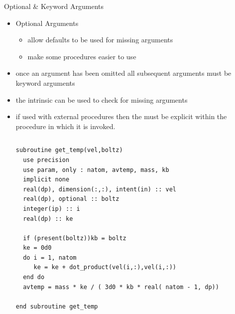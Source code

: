 \documentclass[10pt,t]{beamer}
\begin{document}
\begin{frame}{Optional \& Keyword Arguments}
  \begin{itemize}
    \item Optional Arguments
      \begin{itemize}
        \item allow defaults to be used for missing arguments
        \item make some procedures easier to use
      \end{itemize}
    \item once an argument has been omitted all subsequent arguments must be keyword arguments
    \item the  intrinsic can be used to check for missing arguments
    \item if used with external procedures then the  must be explicit within the procedure in which it is invoked.
      \begin{columns}[t]
        \begin{lstlisting}[language={[90]Fortran},basicstyle=\fontsize{4}{5}\selectfont\ttfamily,mathescape]
subroutine get_temp(vel,boltz)
  use precision
  use param, only : natom, avtemp, mass, kb
  implicit none
  real(dp), dimension(:,:), intent(in) :: vel
  real(dp), optional :: boltz
  integer(ip) :: i
  real(dp) :: ke

  if (present(boltz))kb = boltz
  ke = 0d0
  do i = 1, natom
     ke = ke + dot_product(vel(i,:),vel(i,:))
  end do
  avtemp = mass * ke / ( 3d0 * kb * real( natom - 1, dp))
  
end subroutine get_temp



\end{lstlisting}
\end{columns}
\end{itemize}
\end{frame}
\end{document}
